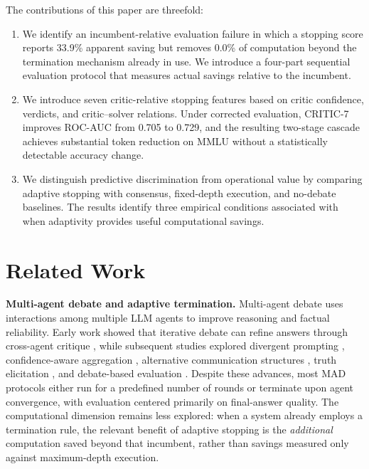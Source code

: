 \documentclass{llncs}
\begin{document}
The contributions of this paper are threefold:
\begin{enumerate}[topsep=4pt,itemsep=4pt,parsep=0pt,partopsep=0pt]
    \item We identify an incumbent-relative evaluation failure in which a stopping score reports 33.9\% apparent saving but removes 0.0\% of computation beyond the termination mechanism already in use. We introduce a four-part sequential evaluation protocol that measures actual savings relative to the incumbent.

    \item We introduce seven critic-relative stopping features based on critic confidence, verdicts, and critic--solver relations. Under corrected evaluation, CRITIC-7 improves ROC-AUC from 0.705 to 0.729, and the resulting two-stage cascade achieves substantial token reduction on MMLU without a statistically detectable accuracy change.

    \item We distinguish predictive discrimination from operational value by comparing adaptive stopping with consensus, fixed-depth execution, and no-debate baselines. The results identify three empirical conditions associated with when adaptivity provides useful computational savings.
\end{enumerate}

\section{Related Work}

\textbf{Multi-agent debate and adaptive termination.}
Multi-agent debate uses interactions among multiple LLM agents to improve reasoning and factual reliability. Early work showed that iterative debate can refine answers through cross-agent critique \cite{ref_1}, while subsequent studies explored divergent prompting \cite{ref_2}, confidence-aware aggregation \cite{ref_3}, alternative communication structures \cite{ref_4}, truth elicitation \cite{ref_5}, and debate-based evaluation \cite{ref_6}. Despite these advances, most MAD protocols either run for a predefined number of rounds or terminate upon agent convergence, with evaluation centered primarily on final-answer quality. The computational dimension remains less explored: when a system already employs a termination rule, the relevant benefit of adaptive stopping is the \emph{additional} computation saved beyond that incumbent, rather than savings measured only against maximum-depth execution.
\end{document}
